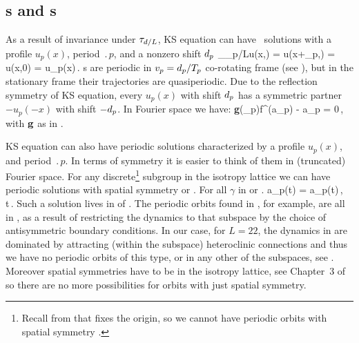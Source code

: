 \subsection{\Rpo s and \po s} \label{sec:KSePO}

As a result of invariance under $\tau_{d/L}$,
KS equation can have \rpo\ solutions
with a profile $u_p(x)$, period $\period{p}$, and a
nonzero shift $d_p$
\beq
  \Shift_{\shift_p/L}u(x,) =
  u(x+\shift_p,) = u(x,0) = u_p(x)\,.
\label{KSrpos}
\eeq
{\Rpo s}  are periodic in
$v_p=d_p/{T_{p}}$ co-rotating frame (see
), but in the stationary frame their
trajectories are quasiperiodic.  Due to the reflection symmetry
 of KS equation, every {\rpo} $u_p(x)$ with shift
$d_p$ has a symmetric partner $-u_p(-x)$ with shift $-d_p$.
In Fourier space we have:
\beq
  {\bf g}(\shift_p)f^(a_p) - a_p = 0\,,
with ${\bf g}$ as in .


KS equation can also have periodic solutions
characterized by a profile $u_p(x)$,
and period $\period{p}$. In terms of symmetry it is easier to think of them
in (truncated) Fourier space. For any discrete\footnote{Recall from  that  fixes the origin, so
we cannot have periodic orbits with spatial symmetry .} subgroup in the isotropy lattice
we can have periodic solutions with spatial symmetry  or . For all $\gamma$ in  or .
\beq
  \gamma a_p(t) = a_p(t)\,, \qquad  \forall t\in[0,\period{p}]\,.
\eeq
Such a solution lives in  of .
The periodic orbits found in , for example,
are all in , as a result of restricting the dynamics to that subspace by the choice of antisymmetric
boundary conditions. In our case, for $L=22$, the dynamics in  are dominated by attracting (within
the subspace) heteroclinic connections and thus we have no periodic orbits of this type, or in
any other of the  subspaces, see . Moreover spatial symmetries have to
be in the isotropy lattice, see Chapter~3 of  so there are no more possibilities
for orbits with just spatial symmetry.


